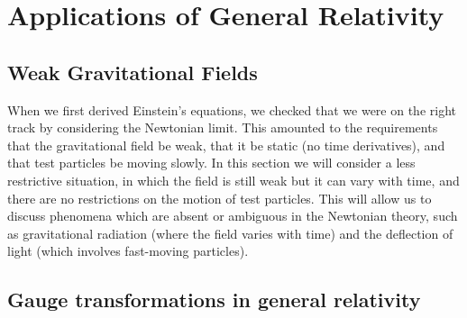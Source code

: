 
\chapter{Applications of General Relativity}
\label{ch:GRapplications}


\section{Weak Gravitational Fields}
When we first derived Einstein’s equations, we checked that we were on the right track by
considering the Newtonian limit. This amounted to the requirements that the gravitational
field be weak, that it be static (no time derivatives), and that test particles be moving slowly.
In this section we will consider a less restrictive situation, in which the field is still weak but
it can vary with time, and there are no restrictions on the motion of test particles. This
will allow us to discuss phenomena which are absent or ambiguous in the Newtonian theory,
such as gravitational radiation (where the field varies with time) and the deflection of light
(which involves fast-moving particles).












\section{Gauge transformations in general relativity}
